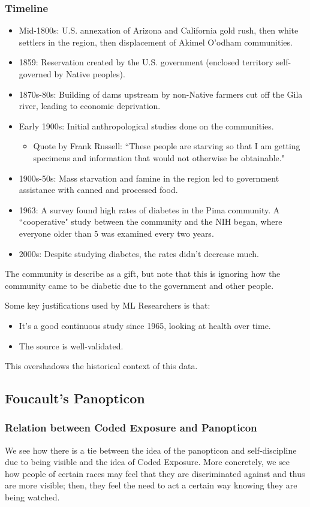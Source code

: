 \documentclass[openany]{book}
\begin{document}
\subsubsection{Timeline}
\begin{itemize}
	\item Mid-1800s: U.S. annexation of Arizona and California gold rush, then white settlers in the region, then displacement of Akimel O'odham communities.
	\item 1859: Reservation created by the U.S. government (enclosed territory self-governed by Native peoples).
	\item 1870s-80s: Building of dams upstream by non-Native farmers cut off the Gila river, leading to economic deprivation.
	\item Early 1900s: Initial anthropological studies done on the communities.
	\begin{itemize}
		\item Quote by Frank Russell: ``These people are starving so that I am getting specimens and information that would not otherwise be obtainable."
	\end{itemize}
	\item 1900s-50s: Mass starvation and famine in the region led to government assistance with canned and processed food.
	\item 1963: A survey found high rates of diabetes in the Pima community. A ``cooperative" study between the community and the NIH began, where everyone older than 5 was examined every two years.
	\item 2000s: Despite studying diabetes, the rates didn't decrease much.
\end{itemize}

The community is describe as a gift, but note that this is ignoring how the community came to be diabetic due to the government and other people.

Some key justifications used by ML Researchers is that:
\begin{itemize}
	\item It's a good continuous study since 1965, looking at health over time.
	\item The source is well-validated.
\end{itemize}

This overshadows the historical context of this data.

\subsection{Foucault's Panopticon}
\subsubsection{Relation between Coded Exposure and Panopticon}
We see how there is a tie between the idea of the panopticon and self-discipline due to being visible and the idea of Coded Exposure. More concretely, we see how people of certain races may feel that they are discriminated against and thus are more visible; then, they feel the need to act a certain way knowing they are being watched.
\end{document}
